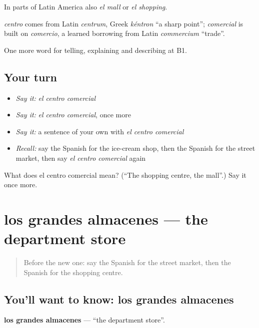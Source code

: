 In parts of Latin America also \emph{el mall} or \emph{el shopping}.

\begin{cousinweb}
\emph{centro} comes from Latin \emph{centrum}, Greek \emph{kéntron} \textquotedblleft{}a sharp point\textquotedblright{}; \emph{comercial} is built on \emph{comercio}, a learned borrowing from Latin \emph{commercium} \textquotedblleft{}trade\textquotedblright{}.
\end{cousinweb}

\begin{grammarlens}[title={What you've built}]
One more word for telling, explaining and describing at B1.
\end{grammarlens}

\subsection*{Your turn}
\begin{itemize}
\raggedright
  \item \emph{Say it:} \emph{el centro comercial}
  \item \emph{Say it:} \emph{el centro comercial}, once more
  \item \emph{Say it:} a sentence of your own with \emph{el centro comercial}
  \item \emph{Recall:} say the Spanish for the ice-cream shop, then the Spanish for the street market, then say \emph{el centro comercial} again
\end{itemize}

\begin{tcolorbox}[breakable,colback=teal!4,colframe=teal!35!black,title={Before you move on}]
What does el centro comercial mean? (\textquotedblleft{}The shopping centre, the mall\textquotedblright{}.) Say it once more.
\end{tcolorbox}
\section[los grandes almacenes]{los grandes almacenes — the department store}

\label{lesson:ES-C681-grandes-almacenes}



\begin{quote}
Before the new one: say the Spanish for the street market, then the Spanish for the shopping centre.
\end{quote}

\subsection*{You'll want to know: los grandes almacenes}
\textbf{los grandes almacenes} — \textquotedblleft{}the department store\textquotedblright{}.

